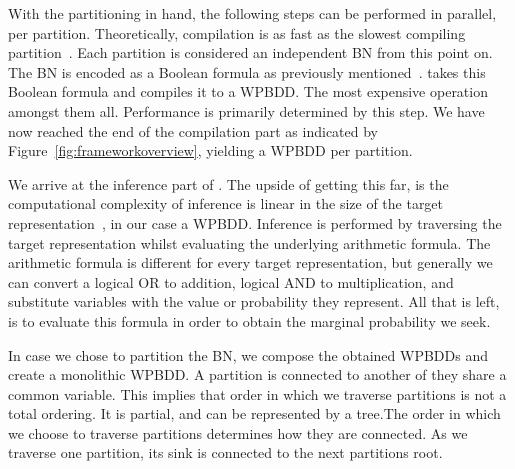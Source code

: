 With the partitioning in hand, the following steps can be performed in parallel, per partition. Theoretically, compilation is as fast as the slowest compiling partition~\cite{dal2018parallel}. Each partition is considered an independent BN from this point on. The BN is encoded as a Boolean formula as previously mentioned~\cite{chavira2008probabilistic}. \toolname takes this Boolean formula and compiles it to a WPBDD. The most expensive operation amongst them all. Performance is primarily determined by this step. We have now reached the end of the compilation part as indicated by Figure~\ref{fig:frameworkoverview}, yielding a WPBDD per partition.

We arrive at the inference part of \toolname. The upside of getting this far, is the computational complexity of inference is linear in the size of the target representation~\cite{darwiche2002knowledge}, in our case a WPBDD. Inference is performed by traversing the target representation whilst evaluating the underlying arithmetic formula. The arithmetic formula is different for every target representation, but generally we can convert a logical OR to addition, logical AND to multiplication, and substitute variables with the value or probability they represent. All that is left, is to evaluate this formula in order to obtain the marginal probability we seek.

In case we chose to partition the BN, we compose the obtained WPBDDs and create a monolithic WPBDD. A partition is connected to another of they share a common variable. This implies that order in which we traverse partitions is not a total ordering. It is partial, and can be represented by a tree.The order in which we choose to traverse partitions determines how they are connected. As we traverse one partition, its sink is connected to the next partitions root.  

